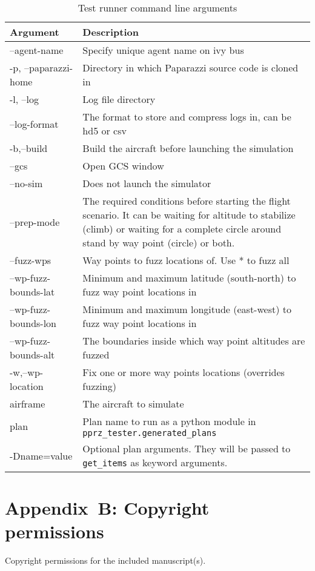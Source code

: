 \begin{table}[]
    \centering
\begin{longtable}{lp{}}
\hline
\textbf{Argument}   & \textbf{Description}\\ \hline
\endhead
%
\hline
\endfoot
%
\endlastfoot
--agent-name          &  Specify unique agent name on ivy bus \\
-p, --paparazzi-home  &  Directory in which Paparazzi source code is cloned in \\
-l, --log             &  Log file directory \\
--log-format          &  The format to store and compress logs in, can be hd5 or csv \\
-b,--build            &  Build the aircraft before launching the simulation \\
--gcs                 &  Open GCS window \\
--no-sim              &  Does not launch the simulator \\
--prep-mode           &  The required conditions before starting the flight scenario. It can be waiting for altitude to stabilize (climb) or waiting for a complete circle around stand by way point (circle) or both. \\
--fuzz-wps            &  Way points to fuzz locations of. Use * to fuzz all \\
--wp-fuzz-bounds-lat  &  Minimum and maximum latitude (south-north) to fuzz way point locations in \\
--wp-fuzz-bounds-lon  &  Minimum and maximum longitude (east-west) to fuzz way point locations in \\
--wp-fuzz-bounds-alt  &  The boundaries inside which way point altitudes are fuzzed \\
-w,--wp-location      &  Fix one or more way points locations (overrides fuzzing) \\
airframe              &  The aircraft to simulate \\
plan                  &  Plan name to run as a python module in \verb|pprz_tester.generated_plans| \\
-Dname=value          &  Optional plan arguments. They will be passed to \verb|get_items| as keyword arguments. \\ \hline
\end{longtable}
\caption{Test runner command line arguments}
\label{tab:test_runner_commandline_args}
\end{table}

\chapter{Appendix~B: Copyright permissions}\label{appendixb}
Copyright permissions for the included manuscript(s).

